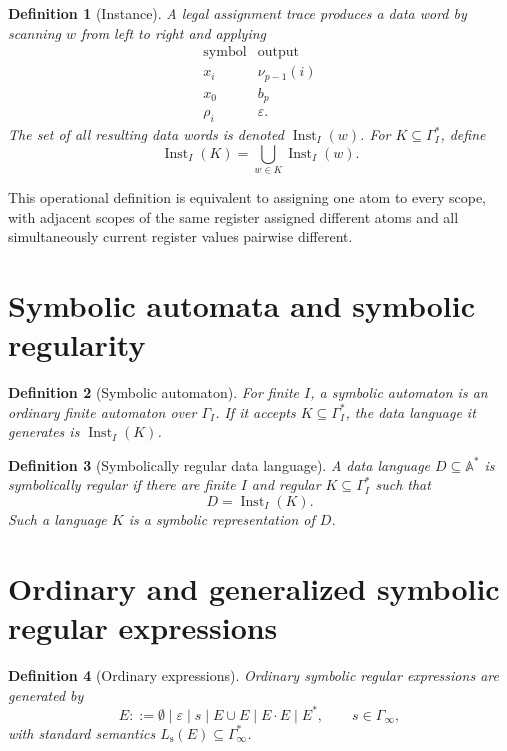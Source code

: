 \documentclass[11pt]{article}
\newtheorem{definition}{Definition}
\begin{document}
\begin{definition}[Instance]
A legal assignment trace produces a data word by scanning $w$ from left to
right and applying
\[
\begin{array}{c|c}
\text{symbol}&\text{output}\\ \hline
x_i&\nu_{p-1}(i)\\
x_0&b_p\\
\rho_i&\varepsilon.
\end{array}
\]
The set of all resulting data words is denoted
$\operatorname{Inst}_I(w)$. For $K\subseteq\Gamma_I^*$, define
\[
 \operatorname{Inst}_I(K)=\bigcup_{w\in K}\operatorname{Inst}_I(w).
\]
\end{definition}

This operational definition is equivalent to assigning one atom to every
scope, with adjacent scopes of the same register assigned different atoms and
all simultaneously current register values pairwise different.

\section{Symbolic automata and symbolic regularity}

\begin{definition}[Symbolic automaton]
For finite $I$, a symbolic automaton is an ordinary finite automaton over
$\Gamma_I$. If it accepts $K\subseteq\Gamma_I^*$, the data language it
generates is $\operatorname{Inst}_I(K)$.
\end{definition}

\begin{definition}[Symbolically regular data language]
A data language $D\subseteq\mathbb A^*$ is \emph{symbolically regular} if
there are finite $I$ and regular $K\subseteq\Gamma_I^*$ such that
\[
 D=\operatorname{Inst}_I(K).
\]
Such a language $K$ is a symbolic representation of $D$.
\end{definition}

\section{Ordinary and generalized symbolic regular expressions}

\begin{definition}[Ordinary expressions]
Ordinary symbolic regular expressions are generated by
\[
 E::=\emptyset\mid\varepsilon\mid s\mid E\cup E\mid E\cdot E\mid E^*,
 \qquad s\in\Gamma_\infty,
\]
with standard semantics $L_{\mathrm s}(E)\subseteq\Gamma_\infty^*$.
\end{definition}
\end{document}
